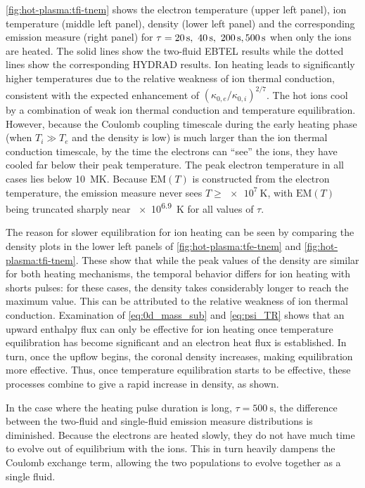 \autoref{fig:hot-plasma:tfi-tnem} shows the electron temperature (upper left panel), ion temperature (middle left panel), density (lower left panel) and the corresponding emission measure (right panel) for $\tau=\SIlist[list-final-separator = {,}]{20;40;200;500}{\second}$ when only the ions are heated. The solid lines show the two-fluid EBTEL results while the dotted lines show the corresponding HYDRAD results. Ion heating leads to significantly higher temperatures due to the relative weakness of ion thermal conduction, consistent with the expected enhancement of $(\kappa_{0,e}/\kappa_{0,i})^{2/7}$. The hot ions cool by a combination of weak ion thermal conduction and temperature equilibration. However, because the Coulomb coupling timescale during the early heating phase (when $T_i\gg T_e$ and the density is low) is much larger than the ion thermal conduction timescale, by the time the electrons can ``see'' the ions, they have cooled far below their peak temperature. The peak electron temperature in all cases lies below \SI{10}{\mega\kelvin}. Because $\mathrm{EM}(T)$ is constructed from the electron temperature, the emission measure never sees $T\ge\SI{e7}{\kelvin}$, with $\mathrm{EM}(T)$ being truncated sharply near \SI{e6.9}{\kelvin} for all values of $\tau$.

The reason for slower equilibration for ion heating can be seen by comparing the density plots in the lower left panels of \autoref{fig:hot-plasma:tfe-tnem} and \autoref{fig:hot-plasma:tfi-tnem}. These show that while the peak values of the density are similar for both heating mechanisms, the temporal behavior differs for ion heating with shorts pulses: for these cases, the density takes considerably longer to reach the maximum value. This can be attributed to the relative weakness of ion thermal conduction. Examination of \autoref{eq:0d_mass_sub} and \autoref{eq:psi_TR} shows that an upward enthalpy flux can only be effective for ion heating once temperature equilibration has become significant and an electron heat flux is established. In turn, once the upflow begins, the coronal density increases, making equilibration more effective. Thus, once temperature equilibration starts to be effective, these processes combine to give a rapid increase in density, as shown.

In the case where the heating pulse duration is long, $\tau=\SI{500}{\second}$, the difference between the two-fluid and single-fluid emission measure distributions is diminished. Because the electrons are heated slowly, they do not have much time to evolve out of equilibrium with the ions. This in turn heavily dampens the Coulomb exchange term, allowing the two populations to evolve together as a single fluid.

